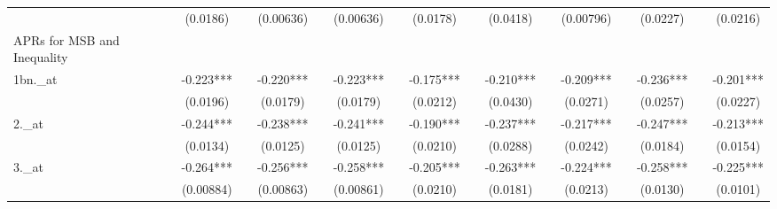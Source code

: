 \documentclass[a4paper, 12pt]{article}
\begin{document}
\begin{table}[H]
\begin{adjustbox}{max width=\textwidth}
\begin{tabular}{llllllllllllllll}
          & \multicolumn{1}{c}{(0.0186)} &       & \multicolumn{1}{c}{(0.00636)} &       & \multicolumn{1}{c}{(0.00636)} &       & \multicolumn{1}{c}{(0.0178)} &       & \multicolumn{1}{c}{(0.0418)} &       & \multicolumn{1}{c}{(0.00796)} &       & \multicolumn{1}{c}{(0.0227)} &       & \multicolumn{1}{c}{(0.0216)} \\
    APRs for MSB and Inequality &       &       &       &       &       &       &       &       &       &       &       &       &       &       &  \\
    1bn.\_at & \multicolumn{1}{c}{-0.223***} &       & \multicolumn{1}{c}{-0.220***} &       & \multicolumn{1}{c}{-0.223***} &       & \multicolumn{1}{c}{-0.175***} &       & \multicolumn{1}{c}{-0.210***} &       & \multicolumn{1}{c}{-0.209***} &       & \multicolumn{1}{c}{-0.236***} &       & \multicolumn{1}{c}{-0.201***} \\
          & \multicolumn{1}{c}{(0.0196)} &       & \multicolumn{1}{c}{(0.0179)} &       & \multicolumn{1}{c}{(0.0179)} &       & \multicolumn{1}{c}{(0.0212)} &       & \multicolumn{1}{c}{(0.0430)} &       & \multicolumn{1}{c}{(0.0271)} &       & \multicolumn{1}{c}{(0.0257)} &       & \multicolumn{1}{c}{(0.0227)} \\
    2.\_at & \multicolumn{1}{c}{-0.244***} &       & \multicolumn{1}{c}{-0.238***} &       & \multicolumn{1}{c}{-0.241***} &       & \multicolumn{1}{c}{-0.190***} &       & \multicolumn{1}{c}{-0.237***} &       & \multicolumn{1}{c}{-0.217***} &       & \multicolumn{1}{c}{-0.247***} &       & \multicolumn{1}{c}{-0.213***} \\
          & \multicolumn{1}{c}{(0.0134)} &       & \multicolumn{1}{c}{(0.0125)} &       & \multicolumn{1}{c}{(0.0125)} &       & \multicolumn{1}{c}{(0.0210)} &       & \multicolumn{1}{c}{(0.0288)} &       & \multicolumn{1}{c}{(0.0242)} &       & \multicolumn{1}{c}{(0.0184)} &       & \multicolumn{1}{c}{(0.0154)} \\
    3.\_at & \multicolumn{1}{c}{-0.264***} &       & \multicolumn{1}{c}{-0.256***} &       & \multicolumn{1}{c}{-0.258***} &       & \multicolumn{1}{c}{-0.205***} &       & \multicolumn{1}{c}{-0.263***} &       & \multicolumn{1}{c}{-0.224***} &       & \multicolumn{1}{c}{-0.258***} &       & \multicolumn{1}{c}{-0.225***} \\
          & \multicolumn{1}{c}{(0.00884)} &       & \multicolumn{1}{c}{(0.00863)} &       & \multicolumn{1}{c}{(0.00861)} &       & \multicolumn{1}{c}{(0.0210)} &       & \multicolumn{1}{c}{(0.0181)} &       & \multicolumn{1}{c}{(0.0213)} &       & \multicolumn{1}{c}{(0.0130)} &       & \multicolumn{1}{c}{(0.0101)} \\

\end{tabular}
\end{adjustbox}
\end{table}
\end{document}
